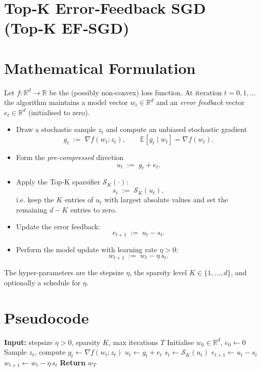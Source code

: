 \documentclass{article}
\newcommand{\topk}[1]{\mathcal{S}_K(#1)} %
\newcommand{\E}{\mathbb{E}}
\begin{document}
\section*{Top‑K Error‑Feedback SGD (Top‑K EF‑SGD)}

\section*{Mathematical Formulation}
Let $f:\mathbb{R}^d\to\mathbb{R}$ be the (possibly non‑convex) loss function.  
At iteration $t=0,1,\dots$ the algorithm maintains a model vector $w_t\in\mathbb{R}^d$ and an \emph{error feedback} vector $e_t\in\mathbb{R}^d$ (initialised to zero).

\begin{itemize}
    \item Draw a stochastic sample $z_t$ and compute an unbiased stochastic gradient
    \[
        g_t \;:=\; \nabla f(w_t;z_t),\qquad 
        \E[g_t\mid w_t]=\nabla f(w_t).
    \]
    \item Form the \emph{pre‑compressed} direction
    \[
        u_t \;:=\; g_t + e_t .
    \]
    \item Apply the Top‑K sparsifier $\topk{\cdot}$:
    \[
        s_t \;:=\; \topk{u_t},
    \]
    i.e. keep the $K$ entries of $u_t$ with largest absolute values and set the remaining $d-K$ entries to zero.
    \item Update the error feedback:
    \[
        e_{t+1}\;:=\; u_t - s_t .
    \]
    \item Perform the model update with learning rate $\eta>0$:
    \[
        w_{t+1}\;:=\; w_t - \eta\, s_t .
    \]
\end{itemize}
The hyper‑parameters are the stepsize $\eta$, the sparsity level $K\in\{1,\dots,d\}$, and optionally a schedule for $\eta$.

\section*{Pseudocode}
\begin{algorithm}[H]
\caption{Top‑K EF‑SGD}
\begin{algorithmic}[1]
\State \textbf{Input:} stepsize $\eta>0$, sparsity $K$, max iterations $T$  
\State Initialise $w_0\in\mathbb{R}^d$, $e_0\gets 0$
    \State Sample $z_t$, compute $g_t\gets \nabla f(w_t;z_t)$
    \State $u_t\gets g_t+e_t$
    \State $s_t\gets \topk{u_t}$ 
    \State $e_{t+1}\gets u_t-s_t$
    \State $w_{t+1}\gets w_t-\eta\,s_t$
\EndFor
\State \textbf{Return} $w_T$
\end{algorithmic}
\end{algorithm}
\end{document}
